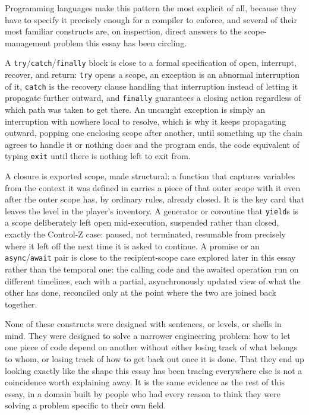 \documentclass[11pt]{article}
\begin{document}
Programming languages make this pattern the most explicit of all, because they have to specify it precisely enough for a compiler to enforce, and several of their most familiar constructs are, on inspection, direct answers to the scope-management problem this essay has been circling.

A \texttt{try}/\texttt{catch}/\texttt{finally} block is close to a formal specification of open, interrupt, recover, and return: \texttt{try} opens a scope, an exception is an abnormal interruption of it, \texttt{catch} is the recovery clause handling that interruption instead of letting it propagate further outward, and \texttt{finally} guarantees a closing action regardless of which path was taken to get there. An uncaught exception is simply an interruption with nowhere local to resolve, which is why it keeps propagating outward, popping one enclosing scope after another, until something up the chain agrees to handle it or nothing does and the program ends, the code equivalent of typing \texttt{exit} until there is nothing left to exit from.

A closure is exported scope, made structural: a function that captures variables from the context it was defined in carries a piece of that outer scope with it even after the outer scope has, by ordinary rules, already closed. It is the key card that leaves the level in the player's inventory. A generator or coroutine that \texttt{yield}s is a scope deliberately left open mid-execution, suspended rather than closed, exactly the Control-Z case: paused, not terminated, resumable from precisely where it left off the next time it is asked to continue. A promise or an \texttt{async}/\texttt{await} pair is close to the recipient-scope case explored later in this essay rather than the temporal one: the calling code and the awaited operation run on different timelines, each with a partial, asynchronously updated view of what the other has done, reconciled only at the point where the two are joined back together.

None of these constructs were designed with sentences, or levels, or shells in mind. They were designed to solve a narrower engineering problem: how to let one piece of code depend on another without either losing track of what belongs to whom, or losing track of how to get back out once it is done. That they end up looking exactly like the shape this essay has been tracing everywhere else is not a coincidence worth explaining away. It is the same evidence as the rest of this essay, in a domain built by people who had every reason to think they were solving a problem specific to their own field.
\end{document}
